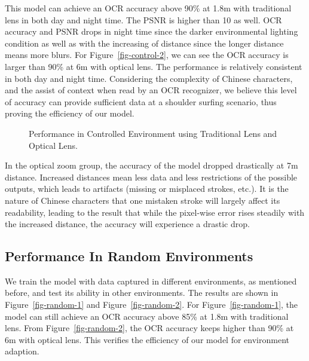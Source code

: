 This model can achieve an OCR accuracy above 90\% at 1.8m with traditional lens in both day and night time. The PSNR is higher than 10 as well. OCR accuracy and PSNR drops in night time since the darker environmental lighting condition as well as with the increasing of distance since the longer distance means more blurs. For Figure~\ref{fig-control-2}, we can see the OCR accuracy is larger than 90\% at 6m with optical lens. The performance is relatively consistent in both day and night time. Considering the complexity of Chinese characters, and the assist of context when read by an OCR recognizer, we believe this level of accuracy can provide sufficient data at a shoulder surfing scenario, thus proving the efficiency of our model.
\begin{figure}[!t]
    \centering
    \hfill
    \caption{Performance in Controlled Environment using Traditional Lens and Optical Lens.}
    \label{fig:control}
\end{figure}

In the optical zoom group, the accuracy of the model dropped drastically at 7m distance. Increased distances mean less data and less restrictions of the possible outputs, which leads to artifacts (missing or misplaced strokes, etc.). It is the nature of Chinese characters that one mistaken stroke will largely affect its readability, leading to the result that while the pixel-wise error rises steadily with the increased distance, the accuracy will experience a drastic drop.

\subsection{Performance In Random Environments}
We train the model with data captured in different environments, as mentioned before, and test its ability in other environments. The results are shown in Figure~\ref{fig-random-1} and Figure~\ref{fig-random-2}. For Figure~\ref{fig-random-1}, the model can still achieve an OCR accuracy above 85\% at 1.8m with traditional lens. From Figure~\ref{fig-random-2}, the OCR accuracy keeps higher than 90\% at 6m with optical lens. This verifies the efficiency of our model for environment adaption.
 
